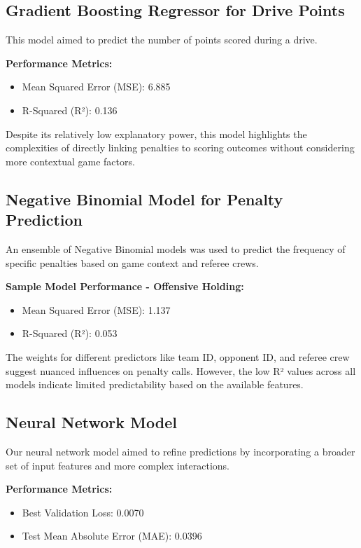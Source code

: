 \documentclass[sigconf, nonacm]{acmart}
\begin{document}
\subsection{Gradient Boosting Regressor for Drive Points}

This model aimed to predict the number of points scored during a drive. 

\textbf{Performance Metrics:}
\begin{itemize}
    \item Mean Squared Error (MSE): 6.885
    \item R-Squared (R²): 0.136
\end{itemize}

Despite its relatively low explanatory power, this model highlights the complexities of directly linking penalties to scoring outcomes without considering more contextual game factors.

\subsection{Negative Binomial Model for Penalty Prediction}

An ensemble of Negative Binomial models was used to predict the frequency of specific penalties based on game context and referee crews.

\textbf{Sample Model Performance - Offensive Holding:}
\begin{itemize}
    \item Mean Squared Error (MSE): 1.137
    \item R-Squared (R²): 0.053
\end{itemize}

The weights for different predictors like team ID, opponent ID, and referee crew suggest nuanced influences on penalty calls. However, the low R² values across all models indicate limited predictability based on the available features.

\subsection{Neural Network Model}

Our neural network model aimed to refine predictions by incorporating a broader set of input features and more complex interactions.

\textbf{Performance Metrics:}
\begin{itemize}
    \item Best Validation Loss: 0.0070
    \item Test Mean Absolute Error (MAE): 0.0396
\end{itemize}
\end{document}
